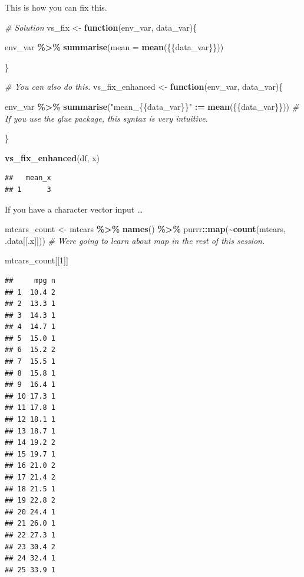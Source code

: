 \documentclass[
]{book}
\newenvironment{Shaded}{\begin{snugshade}}{\end{snugshade}}
\newcommand{\AttributeTok}[1]{\textcolor[rgb]{0.13,0.29,0.53}{#1}}
\newcommand{\CommentTok}[1]{\textcolor[rgb]{0.56,0.35,0.01}{\textit{#1}}}
\newcommand{\ControlFlowTok}[1]{\textcolor[rgb]{0.13,0.29,0.53}{\textbf{#1}}}
\newcommand{\DecValTok}[1]{\textcolor[rgb]{0.00,0.00,0.81}{#1}}
\newcommand{\FunctionTok}[1]{\textcolor[rgb]{0.13,0.29,0.53}{\textbf{#1}}}
\newcommand{\NormalTok}[1]{#1}
\newcommand{\OtherTok}[1]{\textcolor[rgb]{0.56,0.35,0.01}{#1}}
\newcommand{\SpecialCharTok}[1]{\textcolor[rgb]{0.81,0.36,0.00}{\textbf{#1}}}
\newcommand{\StringTok}[1]{\textcolor[rgb]{0.31,0.60,0.02}{#1}}
\begin{document}
This is how you can fix this.

\begin{Shaded}
\begin{Highlighting}[]
\CommentTok{\# Solution}
\NormalTok{vs\_fix }\OtherTok{\textless{}{-}} \ControlFlowTok{function}\NormalTok{(env\_var, data\_var)\{}
 
\NormalTok{   env\_var }\SpecialCharTok{\%\textgreater{}\%}
    \FunctionTok{summarise}\NormalTok{(}\AttributeTok{mean =} \FunctionTok{mean}\NormalTok{(\{\{data\_var\}\}))}

\NormalTok{\}}

\CommentTok{\# You can also do this. }
\NormalTok{vs\_fix\_enhanced }\OtherTok{\textless{}{-}} \ControlFlowTok{function}\NormalTok{(env\_var, data\_var)\{}
 
\NormalTok{   env\_var }\SpecialCharTok{\%\textgreater{}\%}
    \FunctionTok{summarise}\NormalTok{(}\StringTok{"mean\_\{\{data\_var\}\}"} \SpecialCharTok{:=} \FunctionTok{mean}\NormalTok{(\{\{data\_var\}\})) }\CommentTok{\# If you use the glue package, this syntax is very intuitive.}

\NormalTok{\}}

\FunctionTok{vs\_fix\_enhanced}\NormalTok{(df, x)}
\end{Highlighting}
\end{Shaded}

\begin{verbatim}
##   mean_x
## 1      3
\end{verbatim}

If you have a character vector input \ldots{}

\begin{Shaded}
\begin{Highlighting}[]
\NormalTok{mtcars\_count }\OtherTok{\textless{}{-}}\NormalTok{ mtcars }\SpecialCharTok{\%\textgreater{}\%}
  \FunctionTok{names}\NormalTok{() }\SpecialCharTok{\%\textgreater{}\%}
\NormalTok{  purrr}\SpecialCharTok{::}\FunctionTok{map}\NormalTok{(}\SpecialCharTok{\textasciitilde{}}\FunctionTok{count}\NormalTok{(mtcars, .data[[.x]])) }\CommentTok{\# We\textquotesingle{}re going to learn about map in the rest of this session.}

\NormalTok{mtcars\_count[[}\DecValTok{1}\NormalTok{]]}
\end{Highlighting}
\end{Shaded}

\begin{verbatim}
##     mpg n
## 1  10.4 2
## 2  13.3 1
## 3  14.3 1
## 4  14.7 1
## 5  15.0 1
## 6  15.2 2
## 7  15.5 1
## 8  15.8 1
## 9  16.4 1
## 10 17.3 1
## 11 17.8 1
## 12 18.1 1
## 13 18.7 1
## 14 19.2 2
## 15 19.7 1
## 16 21.0 2
## 17 21.4 2
## 18 21.5 1
## 19 22.8 2
## 20 24.4 1
## 21 26.0 1
## 22 27.3 1
## 23 30.4 2
## 24 32.4 1
## 25 33.9 1
\end{verbatim}
\end{document}
